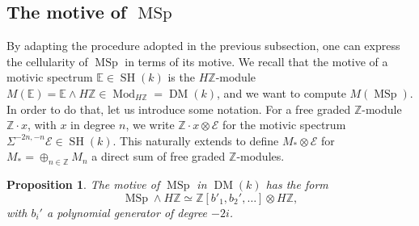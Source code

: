 \documentclass[10pt]{amsart}
\theoremstyle{definition}
\theoremstyle{plain}
\newtheorem{prop}[defn]{Proposition}
\numberwithin{equation}{section}
\newcommand{\0}{\emptyset}
\newcommand{\sE}{{\mathcal E}}
\newcommand{\E}{{\mathbb E}}
\newcommand{\Z}{{\mathbb Z}}
\newcommand{\MSp}{{\operatorname{MSp}}}
\newcommand{\SH}{{\operatorname{SH}}}
\newcommand{\DM}{{\operatorname{DM}}}
\newcommand{\Mod}{{\operatorname{Mod}}}
\begin{document}
\subsection{The motive of $\MSp$}

By adapting the procedure adopted in the previous subsection, one can express the cellularity of $\MSp$ in terms of its motive. We recall that the motive of a motivic spectrum $\E \in \SH(k)$ is the $H\Z$-module $M(\E)=\E \wedge H\Z\in \Mod_{H\Z}=\DM(k)$, and we want to compute $M(\MSp)$. In order to do that, let us introduce some notation. For a free graded $\Z$-module $\Z \cdot x$, with $x$ in degree $n$, we write $\Z \cdot x \otimes \sE$ for the motivic spectrum $\Sigma^{-2n,-n}\sE \in \SH(k)$. This naturally extends to define $M_* \otimes \sE$ for $M_*=\oplus_{n \in \Z}M_n$ a direct sum of free graded $\Z$-modules.

\begin{prop}
\label{prop:MotiveOfMSp}
    The motive of $\MSp$ in $\DM(k)$ has the form
    $$\MSp \wedge H\Z \simeq \Z[b'_1,b_2',\ldots] \otimes H\Z,$$
    with $b_i'$ a polynomial generator of degree $-2i$.
\end{prop}
\end{document}
